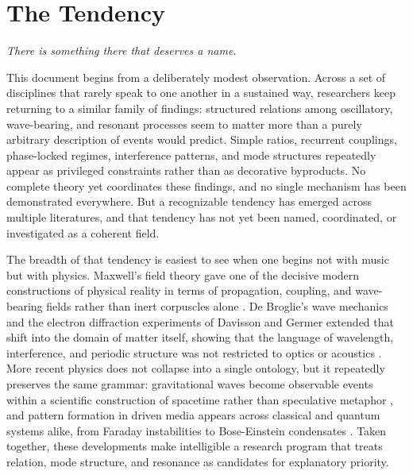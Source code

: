 \chapter{The Tendency}

\epigraph{\emph{There is something there that deserves a name.}}{}

This document begins from a deliberately modest observation. Across a set of disciplines that rarely speak to one another in a sustained way, researchers keep returning to a similar family of findings: structured relations among oscillatory, wave-bearing, and resonant processes seem to matter more than a purely arbitrary description of events would predict. Simple ratios, recurrent couplings, phase-locked regimes, interference patterns, and mode structures repeatedly appear as privileged constraints rather than as decorative byproducts. No complete theory yet coordinates these findings, and no single mechanism has been demonstrated everywhere. But a recognizable tendency has emerged across multiple literatures, and that tendency has not yet been named, coordinated, or investigated as a coherent field.

The breadth of that tendency is easiest to see when one begins not with music but with physics. Maxwell's field theory gave one of the decisive modern constructions of physical reality in terms of propagation, coupling, and wave-bearing fields rather than inert corpuscles alone \parencite{maxwell_1865}. De Broglie's wave mechanics and the electron diffraction experiments of Davisson and Germer extended that shift into the domain of matter itself, showing that the language of wavelength, interference, and periodic structure was not restricted to optics or acoustics \parencites{debroglie_1925}{davisson_1927}. More recent physics does not collapse into a single ontology, but it repeatedly preserves the same grammar: gravitational waves become observable events within a scientific construction of spacetime rather than speculative metaphor \parencite{abbott_2016}, and pattern formation in driven media appears across classical and quantum systems alike, from Faraday instabilities to Bose-Einstein condensates \parencites{engels_2007}{nguyen_2019}. Taken together, these developments make intelligible a research program that treats relation, mode structure, and resonance as candidates for explanatory priority.

